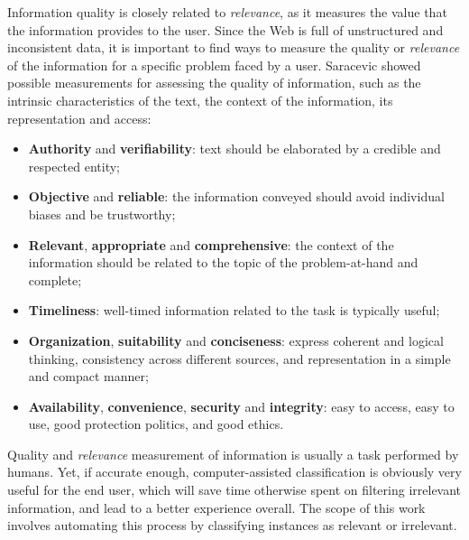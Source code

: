 Information quality is closely related to \textit{relevance}, as it measures the value that the information provides to the user. Since the Web is full of unstructured and inconsistent data, it is important to find ways to measure the quality or \textit{relevance} of the information for a specific problem faced by a user. Saracevic \citep{Saracevic2012QualityInformation} showed possible measurements for assessing the quality of information, such as the intrinsic characteristics of the text, the context of the information, its representation and access:

\begin{itemize}
	\item \textbf{Authority} and \textbf{verifiability}: text should be elaborated by a credible and respected entity;
    \item \textbf{Objective} and \textbf{reliable}: the information conveyed should avoid individual biases and be trustworthy;
    \item \textbf{Relevant}, \textbf{appropriate} and \textbf{comprehensive}: the context of the information should be related to the topic of the problem-at-hand and complete;
    \item \textbf{Timeliness}: well-timed information related to the task is typically useful;
    \item \textbf{Organization}, \textbf{suitability} and \textbf{conciseness}: express coherent and logical thinking, consistency across different sources, and representation in a simple and compact manner;
    \item \textbf{Availability}, \textbf{convenience},  \textbf{security} and \textbf{integrity}: easy to access, easy to use, good protection politics, and good ethics.
\end{itemize}

Quality and \textit{relevance} measurement of information is usually a task performed by humans.
Yet, if accurate enough, computer-assisted classification is obviously very useful for the end user, which will save time otherwise spent on filtering irrelevant information, and lead to a better experience overall. The scope of this work involves automating this process by classifying instances as relevant or irrelevant.

